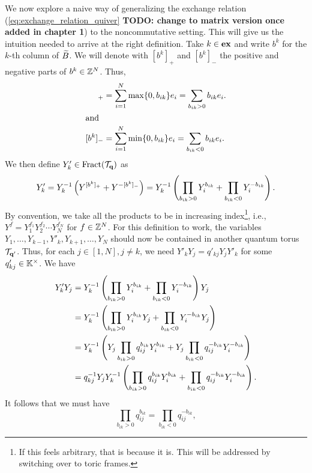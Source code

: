 We now explore a naive way of generalizing the exchange relation
(\cref{eq:exchange_relation_quiver} \textbf{TODO: change to matrix version once added
	in chapter 1}) to the noncommutative setting. This will give us the intuition needed to
arrive at the right definition. Take $k \in \mathbf{ex}$ and write $b^k$ for the $k$-th column
of $\widetilde{B}$. We will denote with $[b^k]_{+}$ and $[b^k]_{-}$ the positive and negative
parts of $b^k \in \mathbb{Z}^N$. Thus,
\begin{align*}
	[b^k]_{+} & = \sum_{i=1}^N \max\{0, b_{ik}\}e_i = \sum_{b_{ik} > 0} b_{ik}e_i. \\
	\shortintertext{and}
	[b^k]_{-} & = \sum_{i=1}^N \min\{0, b_{ik}\}e_i = \sum_{b_{ik} < 0} b_{ik}e_i.
\end{align*}
We then define $Y'_k \in \operatorname{Fract}(\mathcal{T}_{\mathbf{q}})$ as
\begin{equation}\label{eq:quantum_exchange_naive}
	Y_k' = Y_k^{-1} \left(Y^{[b^k]_{+}} + Y^{-[b^k]_{-}}\right) = Y_k^{-1} \left(\prod_{b_{ik} > 0}Y_i^{b_{ik}} + \prod_{b_{ik} < 0} Y_i^{-b_{ik}}\right).
\end{equation}
%
By convention, we take all the products to be in increasing index\footnote{If this
	feels arbitrary, that is because it is. This will be addressed by switching over to
	toric frames.}, i.e., $Y^f = Y_1^{f_1}Y_2^{f_2} \cdots Y_N^{f_N}$ for $f \in \mathbb{Z}^N$.
For this definition to work, the variables $Y_1, \dots, Y_{k-1}, Y'_k, Y_{k+1}, \dots,
	Y_N$ should now be contained in another quantum torus $\mathcal{T}_{\mathbf{q}'}$. Thus, for each $j
	\in [1, N], j \neq k$, we need $Y'_k Y_j = q'_{kj} Y_j Y'_k$ for some $q'_{kj} \in
	\mathbb{K}^\times$. We have
\begin{align*}
	Y'_k Y_j
	 & = Y_k^{-1} \left(\prod_{b_{ik} > 0} Y_i^{b_{ik}} + \prod_{b_{ik} < 0}Y_i^{-b_{ik}}\right) Y_j                                             \\
	 & = Y_k^{-1} \left(\prod_{b_{ik} > 0} Y_i^{b_{ik}}Y_j + \prod_{b_{ik} < 0}Y_i^{-b_{ik}}Y_j\right)                                           \\
	 & = Y_k^{-1} \left(Y_j \prod_{b_{ik} > 0} q_{ij}^{b_{ik}} Y_i^{b_{ik}} + Y_j \prod_{b_{ik} < 0}q_{ij}^{-b_{ik}}Y_i^{-b_{ik}}\right)         \\
	 & = q_{kj}^{-1} Y_j Y_k^{-1} \left(\prod_{b_{ik} > 0} q_{ij}^{b_{ik}} Y_i^{b_{ik}} + \prod_{b_{ik} < 0}q_{ij}^{-b_{ik}}Y_i^{-b_{ik}}\right).
\end{align*}
%
It follows that we must have
\begin{equation}\label{eq:b_plus_is_b_minus}
	\prod_{b_{ik} > 0}q_{ij}^{b_{ik}} = \prod_{b_{ik} < 0}q_{ij}^{ - b_{ik}},
\end{equation}
